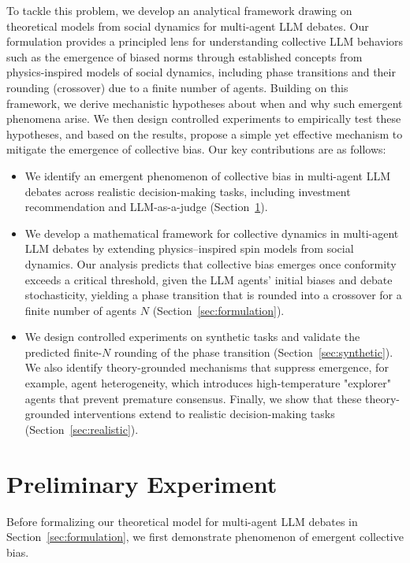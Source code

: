 \documentclass{article}
\theoremstyle{plain}
\theoremstyle{definition}
\theoremstyle{remark}
\begin{document}
To tackle this problem, we develop an analytical framework drawing on theoretical models from social dynamics for multi-agent LLM debates. 
Our formulation provides a principled lens for understanding collective LLM behaviors such as the emergence of biased norms through established concepts from physics-inspired models of social dynamics, including phase transitions and their rounding (crossover) due to a finite number of agents. 
Building on this framework, we derive mechanistic hypotheses about when and why such emergent phenomena arise. 
We then design controlled experiments to empirically test these hypotheses, and based on the results, propose a simple yet effective mechanism to mitigate the emergence of collective bias. 
Our key contributions are as follows: 
\begin{itemize}[leftmargin=*, itemsep=0pt]
    \item We identify an emergent phenomenon of collective bias in multi-agent LLM debates across realistic decision-making tasks, including investment recommendation and LLM-as-a-judge (Section~\ref{sec:preliminary}).
    \item We develop a mathematical framework for collective dynamics in multi-agent LLM debates by extending physics–inspired spin models from social dynamics. Our analysis predicts that collective bias emerges once conformity exceeds a critical threshold, given the LLM agents' initial biases and debate stochasticity, yielding a phase transition that is rounded into a crossover for a finite number of agents $N$ (Section~\ref{sec:formulation}). 
    \item We design controlled experiments on synthetic tasks and validate the predicted finite-$N$ rounding of the phase transition (Section~\ref{sec:synthetic}). We also identify theory-grounded mechanisms that suppress emergence, for example, agent heterogeneity, which introduces high-temperature "explorer" agents that prevent premature consensus. Finally, we show that these theory-grounded interventions extend to realistic decision-making tasks (Section~\ref{sec:realistic}). 
\end{itemize}









\section{Preliminary Experiment}\label{sec:preliminary}
Before formalizing our theoretical model for multi-agent LLM debates in Section~\ref{sec:formulation}, we first demonstrate phenomenon of emergent collective bias. 
\end{document}
